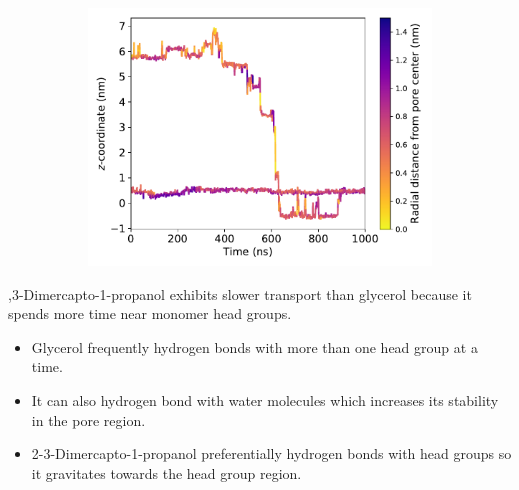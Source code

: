 \documentclass{article}
\begin{document}
  \begin{figure}
  \centering
  \begin{subfigure}{0.45\textwidth}
  \includegraphics[width=\linewidth]{SOH_trace.pdf}
  \caption{}\label{fig:SOH_trace}
  \end{subfigure}
  \caption{}
  \end{figure}
  
  
  ,3-Dimercapto-1-propanol exhibits slower transport than glycerol because it spends more time
  near monomer head groups. %
  \begin{itemize}
    \item Glycerol frequently hydrogen bonds with more than one head group at a time.
    \item It can also hydrogen bond with water molecules which increases its stability
    in the pore region.
    \item 2-3-Dimercapto-1-propanol preferentially hydrogen bonds with head groups 
    so it gravitates towards the head group region.
  \end{itemize} 
  
\end{document}
